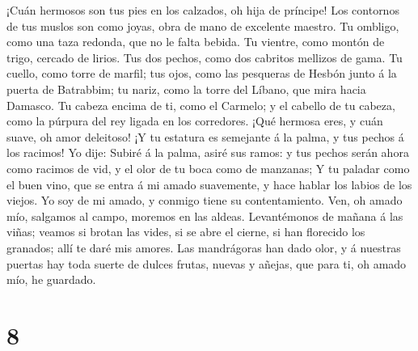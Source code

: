  ¡Cuán hermosos son tus pies en los calzados, oh hija de
príncipe! Los contornos de tus muslos son como joyas, obra de mano de
excelente maestro.  Tu ombligo, como una taza redonda, que
no le falta bebida. Tu vientre, como montón de trigo, cercado de lirios.
 Tus dos pechos, como dos cabritos mellizos de gama.
 Tu cuello, como torre de marfil; tus ojos, como las
pesqueras de Hesbón junto á la puerta de Batrabbim; tu nariz, como la
torre del Líbano, que mira hacia Damasco.  Tu cabeza
encima de ti, como el Carmelo; y el cabello de tu cabeza, como la
púrpura del rey ligada en los corredores.  ¡Qué hermosa
eres, y cuán suave, oh amor deleitoso!  ¡Y tu estatura es
semejante á la palma, y tus pechos á los racimos!  Yo
dije: Subiré á la palma, asiré sus ramos: y tus pechos serán ahora como
racimos de vid, y el olor de tu boca como de manzanas;  Y
tu paladar como el buen vino, que se entra á mi amado suavemente, y hace
hablar los labios de los viejos.  Yo soy de mi amado, y
conmigo tiene su contentamiento.  Ven, oh amado mío,
salgamos al campo, moremos en las aldeas.  Levantémonos
de mañana á las viñas; veamos si brotan las vides, si se abre el cierne,
si han florecido los granados; allí te daré mis amores. 
Las mandrágoras han dado olor, y á nuestras puertas hay toda suerte de
dulces frutas, nuevas y añejas, que para ti, oh amado mío, he guardado.

\hypertarget{section-7}{%
\section{8}\label{section-7}}

